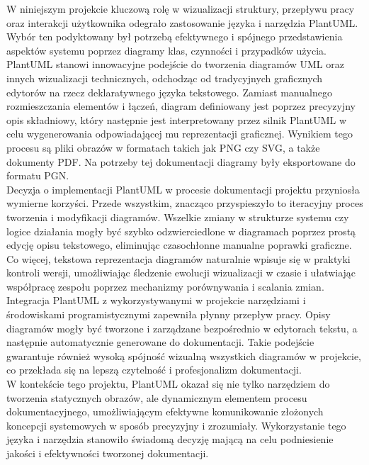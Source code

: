 \documentclass{article}
\begin{document}
W niniejszym projekcie kluczową rolę w wizualizacji struktury, przepływu pracy oraz interakcji użytkownika odegrało zastosowanie języka i narzędzia PlantUML. Wybór ten podyktowany był potrzebą efektywnego i spójnego przedstawienia aspektów systemu poprzez diagramy klas, czynności i przypadków użycia.\\
PlantUML stanowi innowacyjne podejście do tworzenia diagramów UML oraz innych wizualizacji technicznych, odchodząc od tradycyjnych graficznych edytorów na rzecz deklaratywnego języka tekstowego. Zamiast manualnego rozmieszczania elementów i łączeń, diagram definiowany jest poprzez precyzyjny opis składniowy, który następnie jest interpretowany przez silnik PlantUML w celu wygenerowania odpowiadającej mu reprezentacji graficznej. Wynikiem tego procesu są pliki obrazów w formatach takich jak PNG czy SVG, a także dokumenty PDF. Na potrzeby tej dokumentacji diagramy były eksportowane do formatu PGN.\\
Decyzja o implementacji PlantUML w procesie dokumentacji projektu przyniosła wymierne korzyści. Przede wszystkim, znacząco przyspieszyło to iteracyjny proces tworzenia i modyfikacji diagramów. Wszelkie zmiany w strukturze systemu czy logice działania mogły być szybko odzwierciedlone w diagramach poprzez prostą edycję opisu tekstowego, eliminując czasochłonne manualne poprawki graficzne. Co więcej, tekstowa reprezentacja diagramów naturalnie wpisuje się w praktyki kontroli wersji, umożliwiając śledzenie ewolucji wizualizacji w czasie i ułatwiając współpracę zespołu poprzez mechanizmy porównywania i scalania zmian.\\
Integracja PlantUML z wykorzystywanymi w projekcie narzędziami i środowiskami programistycznymi zapewniła płynny przepływ pracy. Opisy diagramów mogły być tworzone i zarządzane bezpośrednio w edytorach tekstu, a następnie automatycznie generowane do dokumentacji. Takie podejście gwarantuje również wysoką spójność wizualną wszystkich diagramów w projekcie, co przekłada się na lepszą czytelność i profesjonalizm dokumentacji.\\
W kontekście tego projektu, PlantUML okazał się nie tylko narzędziem do tworzenia statycznych obrazów, ale dynamicznym elementem procesu dokumentacyjnego, umożliwiającym efektywne komunikowanie złożonych koncepcji systemowych w sposób precyzyjny i zrozumiały. Wykorzystanie tego języka i narzędzia stanowiło świadomą decyzję mającą na celu podniesienie jakości i efektywności tworzonej dokumentacji.
	
\end{document}
